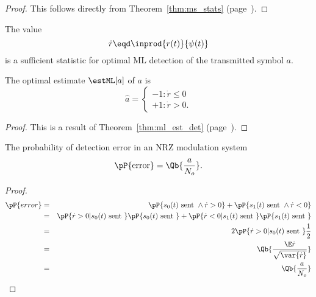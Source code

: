 \begin{proof}
This follows directly from 
Theorem~\ref{thm:ms_stats} (page~\pageref{thm:ms_stats}).
\end{proof}


\begin{proposition}
The value
\[  \dot{r} \eqd \inprod{r(t)}{\psi(t)} \]
is a sufficient statistic for optimal ML detection of the transmitted 
symbol $a$.

The optimal estimate $\estML[a]$ of $a$ is
\[
   \hat{a} = \left\{
     \begin{array}{ll}
        -1 : \dot{r}\le 0 \\
        +1 : \dot{r}>   0.
     \end{array}
     \right.
\]
\end{proposition}

\begin{proof}
   This is a result of Theorem~\ref{thm:ml_est_det} (page~\pageref{thm:ml_est_det}).
\end{proof}

\begin{proposition}
The probability of detection error in an NRZ modulation system
   \[ \pP{\mbox{error}} = \Qb{\frac{a}{N_o}}.\]
\end{proposition}

\begin{proof}
\begin{eqnarray*}
   \pP{error}
     &=& \pP{s_0(t) \mbox{ sent } \land \dot{r}>0 } +
         \pP{s_1(t) \mbox{ sent } \land \dot{r}<0 } 
   \\&=& \pP{\dot{r}>0 | s_0(t) \mbox{ sent }}\pP{s_0(t) \mbox{ sent } } +
         \pP{\dot{r}<0 | s_1(t) \mbox{ sent }}\pP{s_1(t) \mbox{ sent } } 
   \\&=& 2\pP{\dot{r}>0 | s_0(t) \mbox{ sent }}\frac{1}{2}
   \\&=& \Qb{ \frac{\E\dot{r}}{\sqrt{\var{\dot{r}}}}}
   \\&=& \Qb{\frac{a}{N_o}}
\end{eqnarray*}
\end{proof}





